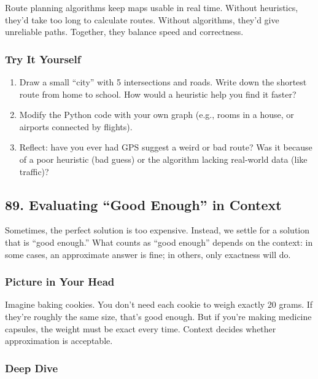 \documentclass[
  letterpaper,
  DIV=11,
  numbers=noendperiod]{scrreprt}
\providecommand{\tightlist}{%
  \setlength{\itemsep}{0pt}\setlength{\parskip}{0pt}}
\begin{document}
Route planning algorithms keep maps usable in real time. Without
heuristics, they'd take too long to calculate routes. Without
algorithms, they'd give unreliable paths. Together, they balance speed
and correctness.

\subsubsection{Try It Yourself}\label{try-it-yourself-88}

\begin{enumerate}
\def\labelenumi{\arabic{enumi}.}
\tightlist
\item
  Draw a small ``city'' with 5 intersections and roads. Write down the
  shortest route from home to school. How would a heuristic help you
  find it faster?
\item
  Modify the Python code with your own graph (e.g., rooms in a house, or
  airports connected by flights).
\item
  Reflect: have you ever had GPS suggest a weird or bad route? Was it
  because of a poor heuristic (bad guess) or the algorithm lacking
  real-world data (like traffic)?
\end{enumerate}

\subsection{89. Evaluating ``Good Enough'' in
Context}\label{evaluating-good-enough-in-context}

Sometimes, the perfect solution is too expensive. Instead, we settle for
a solution that is ``good enough.'' What counts as ``good enough''
depends on the context: in some cases, an approximate answer is fine; in
others, only exactness will do.

\subsubsection{Picture in Your Head}\label{picture-in-your-head-89}

Imagine baking cookies. You don't need each cookie to weigh exactly 20
grams. If they're roughly the same size, that's good enough. But if
you're making medicine capsules, the weight must be exact every time.
Context decides whether approximation is acceptable.

\subsubsection{Deep Dive}\label{deep-dive-59}
\end{document}
